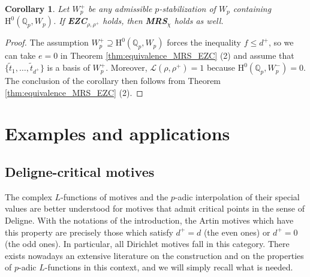 \documentclass[12pt]{amsart}
\newcommand\Qp{{\mathbb{Q}_p}}
\newcommand\cL{\mathcal{L}}
\newcommand{\HH}{\mathrm{H}}
\theoremstyle{defstyle}
\theoremstyle{thmstyle}
\newtheorem{corollaire}[subsubsection]{Corollary}
\begin{document}
\begin{corollaire}\label{coro:EZC_implique_MRS_cas_particulier}
	Let $W_p^+$ be any admissible $p$-stabilization of $W_p$ containing $\HH^0(\Qp,W_p)$. If \textbf{EZC}$_{\rho,\rho^+}$ holds, then \textbf{MRS}$_\chi$ holds as well.
\end{corollaire}
\begin{proof}
	The assumption $W_p^+ \supseteq \HH^0(\Qp,W_p)$ forces the inequality $f\leq d^+$, so we can take $e=0$ in Theorem \ref{thm:equivalence_MRS_EZC} (2) and assume that $\{\widetilde{t}_1,\ldots,\widetilde{t}_{d^+}\}$ is a basis of $W_p^+$. Moreover, $\cL(\rho,\rho^+)=1$ because $\HH^0(\Qp,W_p^-)=0$. The conclusion of the corollary then follows from Theorem \ref{thm:equivalence_MRS_EZC} (2).
\end{proof}

\section{Examples and applications}\label{sec:examples} 
\subsection{Deligne-critical motives}\label{sec:critical_motives}
The complex $L$-functions of motives and the $p$-adic interpolation of their special values are better understood for motives that admit critical points in the sense of Deligne. With the notations of the introduction, the Artin motives which have this property are precisely those which satisfy $d^+=d$ (the even ones) or $d^+=0$ (the odd ones). In particular, all Dirichlet motives fall in this category. There exists nowadays an extensive literature on the construction and on the properties of $p$-adic $L$-functions in this context, and we will simply recall what is needed.
\end{document}
